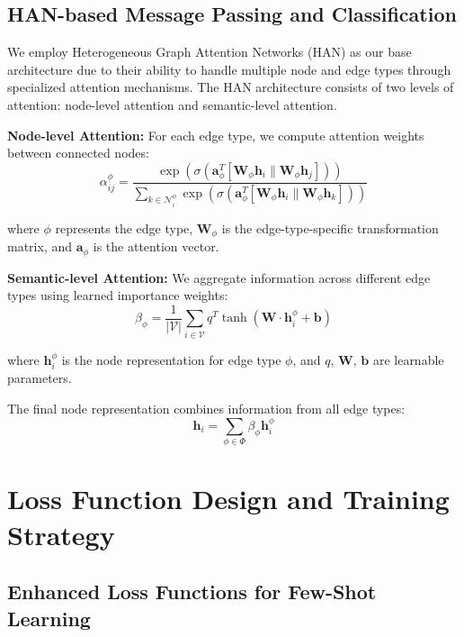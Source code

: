 \subsection{HAN-based Message Passing and Classification}

We employ Heterogeneous Graph Attention Networks (HAN) as our base architecture due to their ability to handle multiple node and edge types through specialized attention mechanisms. The HAN architecture consists of two levels of attention: node-level attention and semantic-level attention.

\textbf{Node-level Attention:} For each edge type, we compute attention weights between connected nodes:
\begin{equation}
\alpha_{ij}^{\phi} = \frac{\exp(\sigma(\mathbf{a}_{\phi}^T[\mathbf{W}_{\phi}\mathbf{h}_i \| \mathbf{W}_{\phi}\mathbf{h}_j]))}{\sum_{k \in \mathcal{N}_i^{\phi}} \exp(\sigma(\mathbf{a}_{\phi}^T[\mathbf{W}_{\phi}\mathbf{h}_i \| \mathbf{W}_{\phi}\mathbf{h}_k]))}
\end{equation}

where $\phi$ represents the edge type, $\mathbf{W}_{\phi}$ is the edge-type-specific transformation matrix, and $\mathbf{a}_{\phi}$ is the attention vector.

\textbf{Semantic-level Attention:} We aggregate information across different edge types using learned importance weights:
\begin{equation}
\beta_{\phi} = \frac{1}{|\mathcal{V}|} \sum_{i \in \mathcal{V}} q^T \tanh(\mathbf{W} \cdot \mathbf{h}_i^{\phi} + \mathbf{b})
\end{equation}

where $\mathbf{h}_i^{\phi}$ is the node representation for edge type $\phi$, and $q$, $\mathbf{W}$, $\mathbf{b}$ are learnable parameters.

The final node representation combines information from all edge types:
\begin{equation}
\mathbf{h}_i = \sum_{\phi \in \Phi} \beta_{\phi} \mathbf{h}_i^{\phi}
\end{equation}

\section{Loss Function Design and Training Strategy}

\subsection{Enhanced Loss Functions for Few-Shot Learning}

